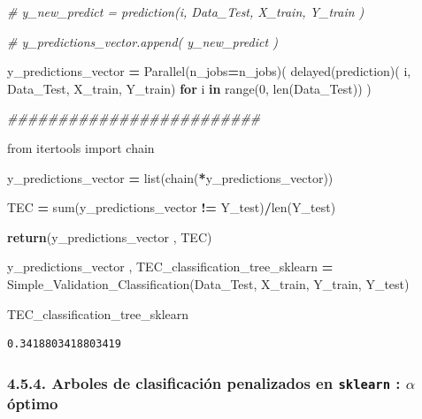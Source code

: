 \documentclass[
  11pt,
  a4paper,
]{article}
\newenvironment{Shaded}{\begin{snugshade}}{\end{snugshade}}
\newcommand{\BuiltInTok}[1]{#1}
\newcommand{\CommentTok}[1]{\textcolor[rgb]{0.56,0.35,0.01}{\textit{#1}}}
\newcommand{\ControlFlowTok}[1]{\textcolor[rgb]{0.13,0.29,0.53}{\textbf{#1}}}
\newcommand{\DecValTok}[1]{\textcolor[rgb]{0.00,0.00,0.81}{#1}}
\newcommand{\ImportTok}[1]{#1}
\newcommand{\KeywordTok}[1]{\textcolor[rgb]{0.13,0.29,0.53}{\textbf{#1}}}
\newcommand{\NormalTok}[1]{#1}
\newcommand{\OperatorTok}[1]{\textcolor[rgb]{0.81,0.36,0.00}{\textbf{#1}}}
\begin{document}
\begin{Shaded}
\begin{Highlighting}[]
        \CommentTok{\# y\_new\_predict = prediction(i, Data\_Test, X\_train, Y\_train )}

        \CommentTok{\# y\_predictions\_vector.append( y\_new\_predict )}

    
\NormalTok{    y\_predictions\_vector }\OperatorTok{=}\NormalTok{ Parallel(n\_jobs}\OperatorTok{=}\NormalTok{n\_jobs)( delayed(prediction)( i, Data\_Test, X\_train, Y\_train) }\ControlFlowTok{for}\NormalTok{ i }\KeywordTok{in} \BuiltInTok{range}\NormalTok{(}\DecValTok{0}\NormalTok{, }\BuiltInTok{len}\NormalTok{(Data\_Test)) )}

    \CommentTok{\#\#\#\#\#\#\#\#\#\#\#\#\#\#\#\#\#\#\#\#\#\#\#\#\#}

    \ImportTok{from}\NormalTok{ itertools }\ImportTok{import}\NormalTok{ chain}

\NormalTok{    y\_predictions\_vector }\OperatorTok{=} \BuiltInTok{list}\NormalTok{(chain(}\OperatorTok{*}\NormalTok{y\_predictions\_vector))}

 
\NormalTok{    TEC }\OperatorTok{=} \BuiltInTok{sum}\NormalTok{(y\_predictions\_vector }\OperatorTok{!=}\NormalTok{ Y\_test)}\OperatorTok{/}\BuiltInTok{len}\NormalTok{(Y\_test)     }

 
    \ControlFlowTok{return}\NormalTok{(y\_predictions\_vector , TEC)}
\end{Highlighting}
\end{Shaded}

\begin{Shaded}
\begin{Highlighting}[]
\NormalTok{y\_predictions\_vector , TEC\_classification\_tree\_sklearn }\OperatorTok{=}\NormalTok{ Simple\_Validation\_Classification(Data\_Test, X\_train, Y\_train, Y\_test)}
\end{Highlighting}
\end{Shaded}

\begin{Shaded}
\begin{Highlighting}[]
\NormalTok{TEC\_classification\_tree\_sklearn}
\end{Highlighting}
\end{Shaded}

\begin{verbatim}
0.3418803418803419
\end{verbatim}

\newpage

\hypertarget{arboles-de-clasificaciuxf3n-penalizados-en-sklearn-alpha-uxf3ptimo}{%
\subsubsection{\texorpdfstring{4.5.4. Arboles de clasificación
penalizados en \texttt{sklearn} : \(\alpha\) óptimo
}{4.5.4. Arboles de clasificación penalizados en sklearn : \textbackslash alpha óptimo }}\label{arboles-de-clasificaciuxf3n-penalizados-en-sklearn-alpha-uxf3ptimo}}
\end{document}
